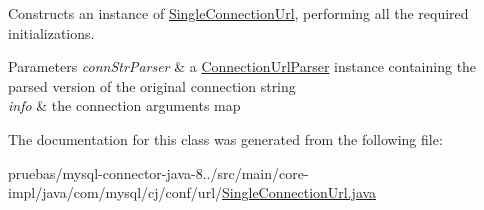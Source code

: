 Constructs an instance of \mbox{\hyperlink{classcom_1_1mysql_1_1cj_1_1conf_1_1url_1_1_single_connection_url}{Single\+Connection\+Url}}, performing all the required initializations.


\begin{DoxyParams}{Parameters}
{\em conn\+Str\+Parser} & a \mbox{\hyperlink{classcom_1_1mysql_1_1cj_1_1conf_1_1_connection_url_parser}{Connection\+Url\+Parser}} instance containing the parsed version of the original connection string \\
\hline
{\em info} & the connection arguments map \\
\hline
\end{DoxyParams}


The documentation for this class was generated from the following file\+:\begin{DoxyCompactItemize}
\item 
pruebas/mysql-\/connector-\/java-\/8../src/main/core-\/impl/java/com/mysql/cj/conf/url/\mbox{\hyperlink{_single_connection_url_8java}{Single\+Connection\+Url.\+java}}\end{DoxyCompactItemize}
